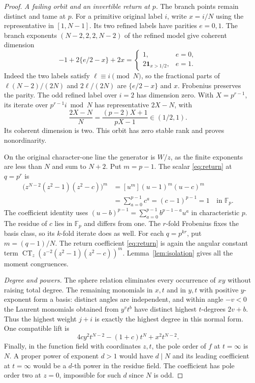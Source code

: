 \documentclass[11pt]{article}
\newcommand{\CT}{\operatorname{CT}}
\newcommand{\F}{\mathbb F}
\begin{document}
\begin{proof}
\smallskip
\noindent\textit{A failing orbit and an invertible return at \(p\).}
The branch points remain distinct and tame at \(p\). For a primitive
original label \(i\), write \(x=i/N\) using the representative in
\([1,N-1]\). Its two refined labels have parities \(e=0,1\).
The branch exponents \((N-2,2,2,N-2)\) of the refined model give
coherent dimension
\[
       -1+2\{e/2-x\}+2x
          =\begin{cases}1,&e=0,\\2\mathbf 1_{x>1/2},&e=1.\end{cases}
\]
Indeed the two labels satisfy \(\ell\equiv i\pmod N\), so the
fractional parts of \(\ell(N-2)/(2N)\) and \(2\ell/(2N)\)
are \(\{e/2-x\}\) and \(x\). Frobenius preserves the parity.
The odd refined label over \(i=2\) has dimension zero. With
\(X=p^{r-1}\), its iterate over \(p^{r-1}i\bmod N\) has
representative \(2X-N\), with
\[
                 \frac{2X-N}{N}=\frac{(p-2)X+1}{pX-1}
                      \in(1/2,1).
\]
Its coherent dimension is two. This orbit has zero stable rank and
proves nonordinarity.

On the original character-one line the generator is \(W/z\), as
the finite exponents are less than \(N\) and sum to \(N+2\).
Put \(m=p-1\). The scalar \eqref{eq:return} at \(q=p^r\) is
\begin{align*}
 [z^{q-1}]\bigl(z^{N-2}(z^2-1)(z^2-c)\bigr)^m
     &=[u^m](u-1)^m(u-c)^m\\
     &=\sum_{a=0}^{p-1}c^a=(c-1)^{p-1}=1\quad\text{in }\F_p.
\end{align*}
The coefficient identity uses
\((u-b)^{p-1}=\sum_{a=0}^{p-1}b^{p-1-a}u^a\) in characteristic
\(p\). The residue of \(c\) lies in \(\F_p\) and differs from one.
The \(r\)-fold Frobenius fixes the basis class, so its \(k\)-fold
iterate does as well. For each \(q=p^{kr}\), put \(m=(q-1)/N\).
The return coefficient \eqref{eq:return} is again the angular
constant term \(\CT_z(z^{-2}(z^2-1)(z^2-c))^m\).
Lemma~\ref{lem:isolation} gives all the moment congruences.

\smallskip
\noindent\textit{Degree and powers.}
The sphere relation eliminates every occurrence of \(xy\) without
raising total degree. The remaining monomials in \(x,t\) and in
\(y,t\) with positive \(y\)-exponent form a basis: distinct angles
are independent, and within angle \(-v<0\) the Laurent monomials
obtained from \(y^vt^b\) have distinct highest \(t\)-degrees \(2v+b\).
Thus the highest weight \(j+i\) is exactly the highest degree in
this normal form. One compatible lift is
\[
         4c y^2t^{N-2}-(1+c)t^N+x^2t^{N-2}.
\]
Finally, in the function field with coordinates \(z,t\), the pole
order of \(f\) at \(t=\infty\) is \(N\). A proper power of exponent
\(d>1\) would have \(d\mid N\) and its leading coefficient at
\(t=\infty\) would be a \(d\)-th power in the residue field. The
coefficient has pole order two at \(z=0\), impossible for such \(d\)
since \(N\) is odd.
\end{proof}
\end{document}
